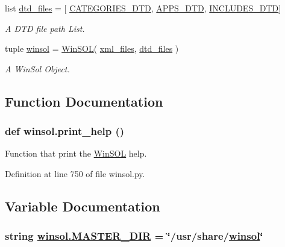 \begin{CompactItemize}
list \hyperlink{namespacewinsol_3bdf23ecc07b0e9a9d7f680ae9c2cb6f}{dtd\_\-files} = \mbox{[} \hyperlink{namespacewinsol_75406b2652e6bf9dc6b9566a0cb0e517}{CATEGORIES\_\-DTD}, \hyperlink{namespacewinsol_de0a178fcabafce978c245668b647015}{APPS\_\-DTD}, \hyperlink{namespacewinsol_9a613f23f40b0893b5d130ccfc1a899e}{INCLUDES\_\-DTD}\mbox{]}
\begin{CompactList}\small\item\em A DTD file path List. \item\end{CompactList}\item 
tuple \hyperlink{namespacewinsol_624e4bca2810b741068d3494a5a7612d}{winsol} = \hyperlink{classwinsol_1_1WinSOL}{Win\-SOL}( \hyperlink{namespacewinsol_e85bfaa286fd710182b7d906a514c2ea}{xml\_\-files}, \hyperlink{namespacewinsol_3bdf23ecc07b0e9a9d7f680ae9c2cb6f}{dtd\_\-files} )
\begin{CompactList}\small\item\em A Win\-Sol Object. \item\end{CompactList}\end{CompactItemize}


\subsection{Function Documentation}
\hypertarget{namespacewinsol_1d428628bd033b6912f0001e379aedf5}{
\subsubsection[print\_\-help]{\setlength{\rightskip}{0pt plus 5cm}def winsol.print\_\-help ()}}
\label{namespacewinsol_1d428628bd033b6912f0001e379aedf5}


Function that print the \hyperlink{classwinsol_1_1WinSOL}{Win\-SOL} help. 



Definition at line 750 of file winsol.py.

\subsection{Variable Documentation}
\hypertarget{namespacewinsol_6681e9b2087addd71f66d08599352879}{
\subsubsection[MASTER\_\-DIR]{\setlength{\rightskip}{0pt plus 5cm}string \hyperlink{namespacewinsol_6681e9b2087addd71f66d08599352879}{winsol.MASTER\_\-DIR} = \char`\"{}/usr/share/\hyperlink{namespacewinsol_624e4bca2810b741068d3494a5a7612d}{winsol}\char`\"{}}}
\label{namespacewinsol_6681e9b2087addd71f66d08599352879}


